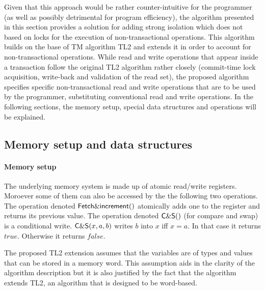 \documentclass[11pt,letterpaper]{article}
\begin{document}
Given that this approach would be rather counter-intuitive for the 
programmer (as well as possibly detrimental for program efficiency), 
the   algorithm presented  in this  section  provides  a solution  for adding
strong isolation which does not based on locks for the execution 
of non-transactional  operations. This  algorithm builds on  the base  of TM
algorithm  TL2 and  extends it in  order to account for  non-transactional 
operations. While read   and write operations that appear inside a 
transaction follow the original TL2 algorithm rather closely (commit-time lock 
acquisition, write-back and validation of the  read set), 
the proposed algorithm 
specifies specific non-transactional read and  write operations 
that are to be used 
by the programmer, substituting conventional read and write operations. 
In the following sections, the memory setup, special data structures 
and operations will be explained.


\subsection{Memory setup and data structures}


\paragraph{Memory setup}
The underlying memory system is made up of atomic read/write registers. 
Moroever some of them can also be accessed by the the following two 
operations. The operation denoted 
${\sf Fetch\&increment}()$ atomically adds one to the register and 
returns its previous value. 
 The operation denoted 
${\sf C\&S}()$ (for compare and swap) is a conditional write. 
${\sf C\&S}(x,a,b)$ writes $b$ into $x$ iff $x=a$. In that case it 
returns $\mathit{true}$. Otherwise it returns  $\mathit{false}$. 


The proposed TL2 extension assumes that the
variables  are  of  types and  values  that  can  be   stored in  a  memory
word. This assumption aids in the clarity of the algorithm description  
but it  is also  justified by the  fact that  the algorithm extends  TL2, an
algorithm that is   designed to be word-based. 
\end{document}
